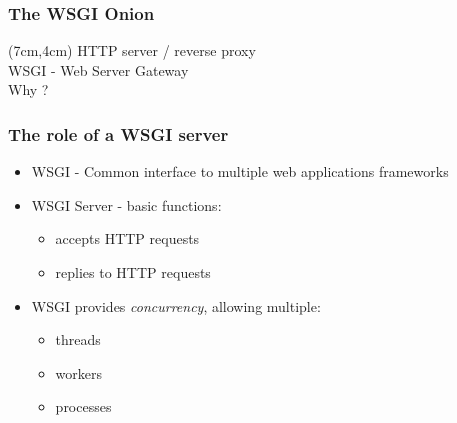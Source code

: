 \documentclass{beamer}
\begin{document}
\begin{frame}
\frametitle<presentation>{The WSGI Onion}


\begin{textblock*}{5cm}(7cm,4cm)
HTTP server / reverse proxy \\
\vspace{0.4cm}
WSGI - Web Server Gateway \\
\vspace{0.4cm}
\huge{Why ?}
\end{textblock*}
\end{frame}

\begin{frame}
\frametitle<presentation>{The role of a WSGI server}

\begin{itemize}
  \item WSGI - Common interface to multiple web applications frameworks
  \item WSGI Server - basic functions:
  \begin{itemize}
    \item accepts HTTP requests
    \item replies to HTTP requests
  \end{itemize}
  \item WSGI provides \textit{concurrency}, allowing multiple: 
  \begin{itemize}
    \item threads
    \item workers
    \item processes
  \end{itemize} 
\end{itemize}
\end{frame}
\end{document}
